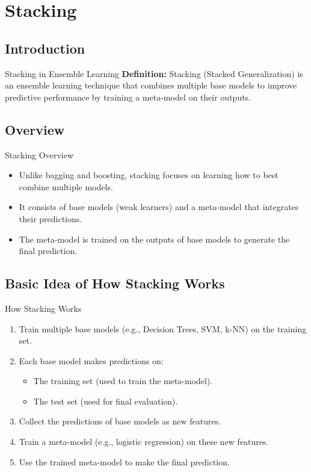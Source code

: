 \documentclass[serif, aspectratio=169]{beamer}
\begin{document}
\section{Stacking}
\subsection{Introduction}
\begin{frame}{Stacking in Ensemble Learning}
    \textbf{Definition:} Stacking (Stacked Generalization) is an ensemble learning technique that combines multiple base models to improve predictive performance by training a meta-model on their outputs.
\end{frame}
\subsection{Overview}
\begin{frame}{Stacking Overview}
    \begin{itemize}
        \item Unlike bagging and boosting, stacking focuses on learning how to best combine multiple models.
        \item It consists of base models (weak learners) and a meta-model that integrates their predictions.
        \item The meta-model is trained on the outputs of base models to generate the final prediction.
    \end{itemize}
\end{frame}

\subsection{Basic Idea of How Stacking Works}
\begin{frame}{How Stacking Works}
    \begin{enumerate}
        \item Train multiple base models (e.g., Decision Trees, SVM, k-NN) on the training set.
        \item Each base model makes predictions on:
        \begin{itemize}
            \item The training set (used to train the meta-model).
            \item The test set (used for final evaluation).
        \end{itemize}
        \item Collect the predictions of base models as new features.
        \item Train a meta-model (e.g., logistic regression) on these new features.
        \item Use the trained meta-model to make the final prediction.
    \end{enumerate}
\end{frame}
\end{document}
